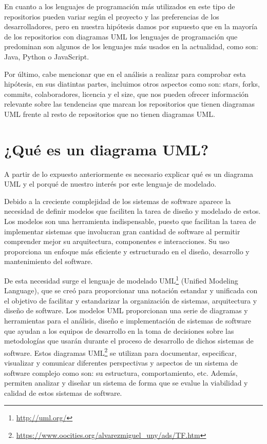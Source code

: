 \documentclass[a4paper, 12pt]{book}
\begin{document}
En cuanto a los lenguajes de programación más utilizados en este tipo de repositorios pueden variar según el proyecto y las preferencias de los desarrolladores, pero en nuestra hipótesis damos por supuesto que en la mayoría de los repositorios con diagramas UML los lenguajes de programación que predominan son algunos de los lenguajes más usados en la actualidad, como son: Java, Python o JavaScript. 


Por último, cabe mencionar que en el análisis a realizar para comprobar esta hipótesis, en sus diatintas partes, incluimos otros aspectos como son: stars, forks, commits, colaboradores, licencia y el size, que nos pueden ofrecer información relevante sobre las tendencias que marcan los repositorios que tienen diagramas UML frente al resto de repositorios que no tienen diagramas UML.


\section{¿Qué es un diagrama UML?} %
\label{sec:qué es un UML} %

A partir de lo expuesto anteriormente es necesario explicar qué es un diagrama UML y el porqué de nuestro interés por este lenguaje de modelado.


Debido a la creciente complejidad de los sistemas de software aparece la necesidad de definir modelos que faciliten la tarea de diseño y modelado de estos. 
Los modelos son una herramienta indispensable, puesto que facilitan la tarea de implementar sistemas que involucran gran cantidad de software al permitir comprender mejor su arquitectura, componentes e interacciones.
Su uso proporciona un enfoque más eficiente y estructurado en el diseño, desarrollo y mantenimiento del software.


De esta necesidad surge el lenguaje de modelado UML\footnote{\url{http://uml.org/}} (Unified Modeling Language), que se creó para proporcionar una notación estandar y unificada con el objetivo de facilitar y estandarizar la organización de sistemas, arquitectura y diseño de software.
Los modelos UML proporcionan una serie de diagramas y herramientas para el análisis, diseño e implementación de sistemas de software que ayudan a los equipos de desarrollo en la toma de decisiones sobre las metodologías que usarán durante el proceso de desarrollo de dichos sistemas de software. 
Estos diagramas UML\footnote{\url{https://www.oocities.org/alvarezmiguel_uny/ads/TF.htm}} se utilizan para documentar, especificar, visualizar y comunicar diferentes perspectivas y aspectos de un sistema de software complejo como son: su estructura, comportamiento, etc.
Además, permiten analizar y diseñar un sistema de forma que se evalue la viabilidad y calidad de estos sistemas de software.
\end{document}
